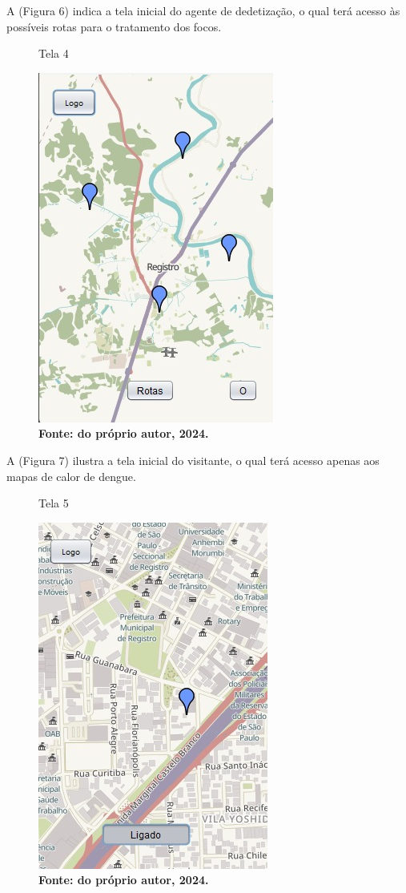 \vspace{12pt}

A (Figura 6) indica a tela inicial do agente de dedetização, o qual terá acesso às possíveis rotas para o tratamento dos focos.

\begin{figure}[H]
    \centering
    \caption{Tela 4}
    \includegraphics[width=0.5\linewidth]{Illustrations/Dedetizador.jpg}
    \caption*{\textbf{Fonte: do próprio autor, 2024.}}
\end{figure}

\vspace{12pt}

A (Figura 7) ilustra a tela inicial do visitante, o qual terá acesso apenas aos mapas de calor de dengue.

\begin{figure}[H]
    \centering
    \caption{Tela 5}
    \includegraphics[width=0.5\linewidth]{Illustrations/Visitante.jpg}
    \caption*{\textbf{Fonte: do próprio autor, 2024.}}
\end{figure}

